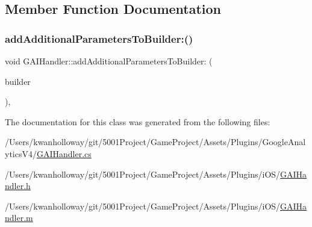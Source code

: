 \subsection{Member Function Documentation}
\mbox{\label{class_g_a_i_handler_a94ebfe68a07ecb28a086667eb7dab53f}} 
\subsubsection{\texorpdfstring{add\+Additional\+Parameters\+To\+Builder\+:()}{addAdditionalParametersToBuilder:()}}
{\footnotesize\ttfamily void G\+A\+I\+Handler\+::add\+Additional\+Parameters\+To\+Builder\+: (\begin{DoxyParamCaption}\item[{\hyperlink{interface_g_a_i_dictionary_builder}{G\+A\+I\+Dictionary\+Builder}$\ast$}]{builder }\end{DoxyParamCaption})\hspace{0.3cm}{\ttfamily [static]}, {\ttfamily [virtual]}}



The documentation for this class was generated from the following files\+:\begin{DoxyCompactItemize}
\item 
/\+Users/kwanholloway/git/5001\+Project/\+Game\+Project/\+Assets/\+Plugins/\+Google\+Analytics\+V4/\hyperlink{_g_a_i_handler_8cs}{G\+A\+I\+Handler.\+cs}\item 
/\+Users/kwanholloway/git/5001\+Project/\+Game\+Project/\+Assets/\+Plugins/i\+O\+S/\hyperlink{_g_a_i_handler_8h}{G\+A\+I\+Handler.\+h}\item 
/\+Users/kwanholloway/git/5001\+Project/\+Game\+Project/\+Assets/\+Plugins/i\+O\+S/\hyperlink{_g_a_i_handler_8m}{G\+A\+I\+Handler.\+m}\end{DoxyCompactItemize}
